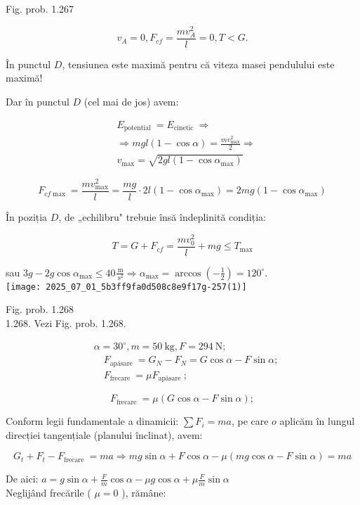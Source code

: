 Fig. prob. 1.267

$$
v_{A}=0, F_{c f}=\frac{m v_{A}^{2}}{l}=0, T<G .
$$

În punctul $D$, tensiunea este maximă pentru că viteza masei pendulului este maximă!

Dar în punctul $D$ (cel mai de jos) avem:

$$
\begin{aligned}
& E_{\text {potential }}=E_{\text {cinetic }} \Rightarrow \\
& \Rightarrow m g l(1-\cos \alpha)=\frac{m v_{\max }^{2}}{2} \Rightarrow \\
& v_{\max }=\sqrt{2 g l\left(1-\cos \alpha_{\max }\right)}
\end{aligned}
$$

$$
F_{c f \max }=\frac{m v_{\max }^{2}}{l}=\frac{m g}{l} \cdot 2 l\left(1-\cos \alpha_{\max }\right)=2 m g\left(1-\cos \alpha_{\max }\right)
$$

În poziția $D$, de „echilibru" trebuie însă îndeplinită condiția:

$$
T=G+F_{c f}=\frac{m v_{0}^{2}}{l}+m g \leq T_{\max }
$$

sau $3 g-2 g \cos \alpha_{\max } \leq 40 \frac{\mathrm{~m}}{\mathrm{~s}^{2}} \Rightarrow \alpha_{\max }=\arccos \left(-\frac{1}{2}\right)=120^{\circ}$.\\
\texttt{[image: 2025\_07\_01\_5b3ff9fa0d508c8e9f17g-257(1)]}

Fig. prob. 1.268\\
1.268. Vezi Fig. prob. 1.268.

$$
\begin{aligned}
& \alpha=30^{\circ}, m=50 \mathrm{~kg}, F=294 \mathrm{~N} ; \\
& \quad F_{\text {apăsare }}=G_{N}-F_{N}=G \cos \alpha-F \sin \alpha ; \\
& \quad F_{\text {frecare }}=\mu F_{\text {apăsare }} ;
\end{aligned}
$$

$$
F_{\text {frecare }}=\mu(G \cos \alpha-F \sin \alpha) ;
$$

Conform legii fundamentale a dinamicii: $\sum F_{i}=m a$, pe care $o$ aplicăm în lungul direcției tangențiale (planului înclinat), avem:

$$
G_{t}+F_{t}-F_{\text {frecare }}=m a \Rightarrow m g \sin \alpha+F \cos \alpha-\mu(m g \cos \alpha-F \sin \alpha)=m a
$$

De aici: $a=g \sin \alpha+\frac{F}{m} \cos \alpha-\mu g \cos \alpha+\mu \frac{F}{m} \sin \alpha$\\
Neglijând frecările ( $\mu=0$ ), rămâne:

